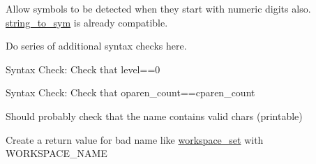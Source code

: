 
\begin{DoxyRefList}
\item[\label{todo__todo000001}%
\Hypertarget{todo__todo000001}%
Global \hyperlink{expression__lite_8h_a63988c00ace0261c4896f132f5f86fda}{string\+\_\+to\+\_\+expression} (size\+\_\+t str\+\_\+len, char const $\ast$str)]Allow symbols to be detected when they start with numeric digits also. \hyperlink{symbolic_8h_a78aa047f421c2d8ab5fab3c72d123d1b}{string\+\_\+to\+\_\+sym} is already compatible. 

Do series of additional syntax checks here. 

Syntax Check\+: Check that level==0 

Syntax Check\+: Check that oparen\+\_\+count==cparen\+\_\+count  
\item[\label{todo__todo000005}%
\Hypertarget{todo__todo000005}%
Global \hyperlink{symbolic_8h_a51d47153d7323b2941308b506bd90578}{sym\+\_\+new\+\_\+name} (char $\ast$name)]Should probably check that the name contains valid chars (printable)  
\item[\label{todo__todo000006}%
\Hypertarget{todo__todo000006}%
Global \hyperlink{workspace_8h_a3af2e8d4387ce8986db09a9eb7328bc1}{workspace\+\_\+get} (char $\ast$name)]Create a return value for bad name like \hyperlink{workspace_8h_a536b0f47bc3b9177d1aaca025a05515a}{workspace\+\_\+set} with W\+O\+R\+K\+S\+P\+A\+C\+E\+\_\+\+N\+A\+ME 
\end{DoxyRefList}